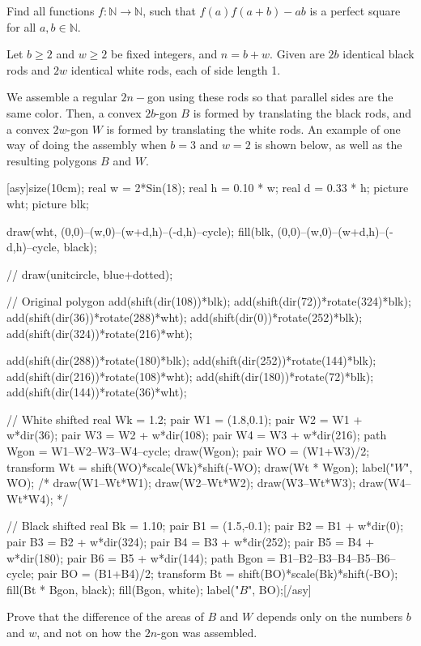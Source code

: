 \documentclass[11pt]{scrartcl}
\begin{document}
\begin{problem}[2583236079961296677]
	Find all functions $f:\mathbb{N} \rightarrow \mathbb{N}$, such that $f(a)f(a+b)-ab$ is a perfect square for all $a, b \in \mathbb{N}$.
\end{problem}
\begin{problem}[2594275832195659804]
Let $b\geq2$ and $w\geq2$ be fixed integers, and $n=b+w$. Given are $2b$ identical black rods and $2w$ identical white rods, each of side length 1.

We assemble a regular $2n-$gon using these rods so that parallel sides are the same color. Then, a convex $2b$-gon $B$ is formed by translating the black rods, and a convex $2w$-gon $W$ is formed by translating the white rods. An example of one way of doing the assembly when $b=3$ and $w=2$ is shown below, as well as the resulting polygons $B$ and $W$.

[asy]size(10cm);
real w = 2*Sin(18);
real h = 0.10 * w;
real d = 0.33 * h;
picture wht;
picture blk;

draw(wht, (0,0)--(w,0)--(w+d,h)--(-d,h)--cycle);
fill(blk, (0,0)--(w,0)--(w+d,h)--(-d,h)--cycle, black);

// draw(unitcircle, blue+dotted);

// Original polygon
add(shift(dir(108))*blk);
add(shift(dir(72))*rotate(324)*blk);
add(shift(dir(36))*rotate(288)*wht);
add(shift(dir(0))*rotate(252)*blk);
add(shift(dir(324))*rotate(216)*wht);

add(shift(dir(288))*rotate(180)*blk);
add(shift(dir(252))*rotate(144)*blk);
add(shift(dir(216))*rotate(108)*wht);
add(shift(dir(180))*rotate(72)*blk);
add(shift(dir(144))*rotate(36)*wht);

// White shifted
real Wk = 1.2;
pair W1 = (1.8,0.1);
pair W2 = W1 + w*dir(36);
pair W3 = W2 + w*dir(108);
pair W4 = W3 + w*dir(216);
path Wgon = W1--W2--W3--W4--cycle;
draw(Wgon);
pair WO = (W1+W3)/2;
transform Wt = shift(WO)*scale(Wk)*shift(-WO);
draw(Wt * Wgon);
label("$W$", WO);
/*
draw(W1--Wt*W1);
draw(W2--Wt*W2);
draw(W3--Wt*W3);
draw(W4--Wt*W4);
*/

// Black shifted
real Bk = 1.10;
pair B1 = (1.5,-0.1);
pair B2 = B1 + w*dir(0);
pair B3 = B2 + w*dir(324);
pair B4 = B3 + w*dir(252);
pair B5 = B4 + w*dir(180);
pair B6 = B5 + w*dir(144);
path Bgon = B1--B2--B3--B4--B5--B6--cycle;
pair BO = (B1+B4)/2;
transform Bt = shift(BO)*scale(Bk)*shift(-BO);
fill(Bt * Bgon, black);
fill(Bgon, white);
label("$B$", BO);[/asy]

Prove that the difference of the areas of $B$ and $W$ depends only on the numbers $b$ and $w$, and not on how the $2n$-gon was assembled.
\end{problem}
\end{document}
